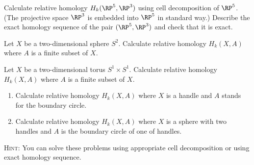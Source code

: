 








\exercises
\begin{xca}
Calculate relative homology $H_k(\RP^5, \RP^3)$ using cell
decomposition of $\RP^5$. (The projective space $\RP^3$ is
embedded into $\RP^5$ in standard way.) Describe the exact
homology sequence of the pair $(\RP^5 , \RP^3)$ and check that it
is exact.
\end{xca}
\begin{xca}
Let $X$ be a two-dimensional sphere $S^2$. Calculate relative homology $H_k (X, A)$ where $A$ is a finite subset of $X$.
\end{xca}
\begin{xca}
Let $X$ be a two-dimensional torus $S^1\times S^1$. Calculate relative homology $H_k(X, A)$ where $A$ is a finite subset of $X$.
\end{xca}
\begin{xca}
\begin{enumerate}
\item Calculate relative homology $H_k(X, A)$ where $X$ is a
  handle and $A$ stands for the boundary circle.
\item Calculate relative homology $H_k (X, A)$ where $X$ is a
  sphere with two handles and $A$ is the boundary circle of one
  of handles. 
\end{enumerate}
\textsc{Hint:} You can solve these problems using appropriate
cell decomposition or using exact homology sequence. 
\end{xca}
